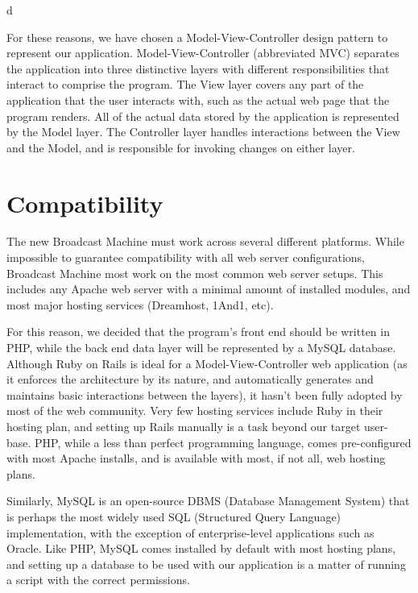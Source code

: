 d\documentclass[a4paper,12pt]{report}
\begin{document}
For these reasons, we have chosen a Model-View-Controller design pattern to represent our application. 
Model-View-Controller (abbreviated MVC) separates the application into three distinctive layers with different responsibilities that interact to comprise the program. 
The View layer covers any part of the application that the user interacts with, such as the actual web page that the program renders. 
All of the actual data stored by the application is represented by the Model layer. 
The Controller layer handles interactions between the View and the Model, and is responsible for invoking changes on either layer.

\section{Compatibility}

The new Broadcast Machine must work across several different platforms. 
While impossible to guarantee compatibility with all web server configurations, Broadcast Machine most work on the most common web server setups. 
This includes any Apache web server with a minimal amount of installed modules, and most major hosting services (Dreamhost, 1And1, etc). 

For this reason, we decided that the program’s front end should be written in PHP, while the back end data layer will be represented by a MySQL database. Although Ruby on Rails is ideal for a Model-View-Controller web application (as it enforces the architecture by its nature, and automatically generates and maintains basic interactions between the layers), it hasn’t been fully adopted by most of the web community. 
Very few hosting services include Ruby in their hosting plan, and setting up Rails manually is a task beyond our target user-base. 
PHP, while a less than perfect programming language, comes pre-configured with most Apache installs, and is available with most, if not all, web hosting plans. 

Similarly, MySQL is an open-source DBMS (Database Management System) that is perhaps the most widely used SQL (Structured Query Language) implementation, with the exception of enterprise-level applications such as Oracle. 
Like PHP, MySQL comes installed by default with most hosting plans, and setting up a database to be used with our application is a matter of running a script with the correct permissions. 
\end{document}
